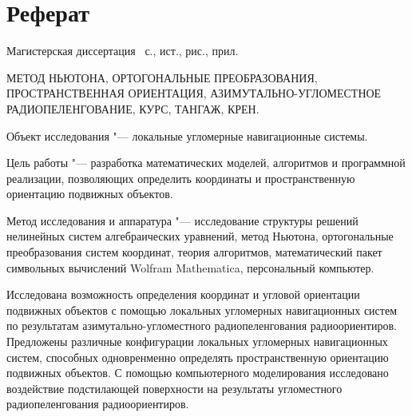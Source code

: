 \documentclass[../main.tex]{subfiles}
\begin{document}
\newpage
\section*{\centering Реферат}

\par\noindent Магистерская диссертация ~с.,  ист., \totalfigures{} рис.,  прил.\\
\vspace{0.5cm}

\par\noindent  МЕТОД НЬЮТОНА, ОРТОГОНАЛЬНЫЕ ПРЕОБРАЗОВАНИЯ, ПРОСТРАНСТВЕННАЯ ОРИЕНТАЦИЯ, АЗИМУТАЛЬНО-УГЛОМЕСТНОЕ РАДИОПЕЛЕНГОВАНИЕ, КУРС, ТАНГАЖ, КРЕН. \\

\par\noindent Объект исследования "--- локальные угломерные навигационные системы.\\
\par\noindent Цель работы "--- разработка математических моделей, алгоритмов и программной реализации, позволяющих определить координаты и пространственную ориентацию подвижных объектов.\\
\par\noindent Метод исследования и аппаратура "--- исследование структуры решений нелинейных систем алгебраических уравнений, метод Ньютона, ортогональные преобразования систем координат, теория алгоритмов, математический пакет символьных вычислений {\ttfamily Wolfram Mathematica}, персональный компьютер.\\

\par\noindent Исследована возможность определения координат и угловой ориентации подвижных объектов с помощью локальных угломерных навигационных систем по результатам азимутально-угломестного радиопеленгования радиоориентиров. Предложены различные конфигурации локальных угломерных навигационных систем, способных одновренменно определять пространственную ориентацию подвижных объектов. С помощью компьютерного моделирования исследовано воздействие подстилающей поверхности на результаты угломестного радиопеленгования радиоориентиров.

\clearpage
\normalsize
\end{document}
